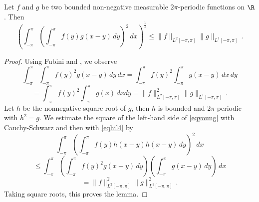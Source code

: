 \begin{lemma}\label{Young-convolution}
\leanok
{}
    Let $f$ and $g$ be two bounded non-negative measurable $2\pi$-periodic functions on $\R$. Then
    \begin{equation}\label{eqyoung}
        \left(\int_{-\pi}^{\pi} \left(\int_{-\pi}^{\pi}
        f(y)g(x-y)\, dy\right)^2\, dx\right)^{\frac 12}\le \|f\|_{L^2[-\pi, \pi]} \|g\|_{L^1[-\pi, \pi]}\, .
    \end{equation}
    \end{lemma}
\begin{proof}
\leanok
    Using Fubini and , we observe
\begin{equation*}
  \int_{-\pi}^{\pi}\int_{-\pi}^{\pi}f(y)^2g(x-y)\, dy
    \, dx=\int_{-\pi}^{\pi}f(y)^2\int_{-\pi}^{\pi}g(x-y)\, dx
    \, dy
\end{equation*}
\begin{equation}\label{eqhil4}
=\int_{-\pi}^{\pi}f(y)^2\int_{-\pi}^{\pi}g(x) \, dx
     dy
=\|f\|_{L^2[-\pi, \pi]}^2\|g\|_{L^1[-\pi, \pi]}\, .
\end{equation}
   Let $h$ be the nonnegative square root of $g$, then
   $h$ is bounded and $2\pi$-periodic with $h^2=g$.
   We estimate the square of the left-hand side of
   \eqref{eqyoung} with Cauchy-Schwarz and then with
   \eqref{eqhil4} by
       \begin{equation*}
         \int_{-\pi}^{\pi} (\int_{-\pi}^{\pi}f(y)h(x-y)h(x-y)\, dy)^2\, dx
   \end{equation*}
\begin{equation*}
    \le \int_{-\pi}^{\pi}\left(\int_{-\pi}^{\pi}f(y)^2g(x-y)\, dy\right)
    \left(\int_{-\pi}^{\pi}g(x-y)\, dy\right)\, dx
\end{equation*}
\begin{equation*}
    = \|f\|_{L^2[-\pi, \pi]}^2\|g\|_{L^1[-\pi, \pi]}^2\, .
\end{equation*}
Taking square roots, this proves the lemma.
\end{proof}


